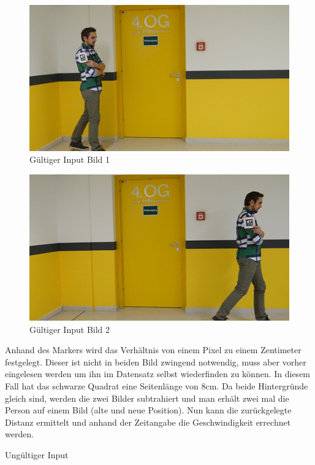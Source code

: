 \documentclass[deutsch]{scrartcl}
\begin{document}
\begin{figure}[ht]
	\centering
	\includegraphics{testimg1.png}
	\caption{Gültiger Input Bild 1}
	\label{fig1}
\end{figure}
\begin{figure}[ht]
	\centering
	\includegraphics{testimg2.png}
	\caption{Gültiger Input Bild 2}
	\label{fig2}
\end{figure}
Anhand des Markers wird das Verhältnis von einem Pixel zu einem Zentimeter festgelegt.
Dieser ist nicht in beiden Bild zwingend notwendig, muss aber vorher eingelesen werden um ihn im Datensatz selbst wiederfinden zu können. In diesem Fall hat das schwarze Quadrat eine Seitenlänge von 8cm.
Da beide Hintergründe gleich sind, werden die zwei Bilder subtrahiert und man erhält zwei mal die Person auf einem Bild (alte und neue Position). Nun kann die zurückgelegte Distanz ermittelt und anhand der Zeitangabe die Geschwindigkeit errechnet werden.

Ungültiger Input
\end{document}
